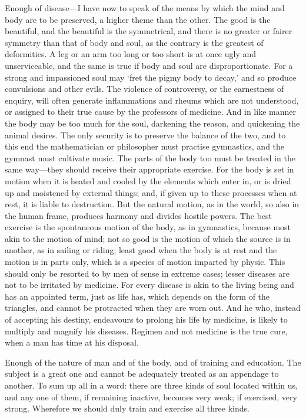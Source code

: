 Enough of disease—I have now to speak of the means by which the mind
and body are to be preserved, a higher theme than the other. The good is
the beautiful, and the beautiful is the symmetrical, and there is no
greater or fairer symmetry than that of body and soul, as the contrary is
the greatest of deformities. A leg or an arm too long or too short is at
once ugly and unserviceable, and the same is true if body and soul are
disproportionate. For a strong and impassioned soul may ‘fret the pigmy
body to decay,’ and so produce convulsions and other evils. The violence
of controversy, or the earnestness of enquiry, will often generate
inflammations and rheums which are not understood, or assigned to their
true cause by the professors of medicine. And in like manner the body may
be too much for the soul, darkening the reason, and quickening the animal
desires. The only security is to preserve the balance of the two, and to
this end the mathematician or philosopher must practise gymnastics, and
the gymnast must cultivate music. The parts of the body too must be
treated in the same way—they should receive their appropriate
exercise. For the body is set in motion when it is heated and cooled by
the elements which enter in, or is dried up and moistened by external
things; and, if given up to these processes when at rest, it is liable to
destruction. But the natural motion, as in the world, so also in the human
frame, produces harmony and divides hostile powers. The best exercise is
the spontaneous motion of the body, as in gymnastics, because most akin to
the motion of mind; not so good is the motion of which the source is in
another, as in sailing or riding; least good when the body is at rest and
the motion is in parts only, which is a species of motion imparted by
physic. This should only be resorted to by men of sense in extreme cases;
lesser diseases are not to be irritated by medicine. For every disease is
akin to the living being and has an appointed term, just as life has,
which depends on the form of the triangles, and cannot be protracted when
they are worn out. And he who, instead of accepting his destiny,
endeavours to prolong his life by medicine, is likely to multiply and
magnify his diseases. Regimen and not medicine is the true cure, when a
man has time at his disposal.

Enough of the nature of man and of the body, and of training and
education. The subject is a great one and cannot be adequately treated as
an appendage to another. To sum up all in a word: there are three kinds of
soul located within us, and any one of them, if remaining inactive,
becomes very weak; if exercised, very strong. Wherefore we should duly
train and exercise all three kinds.

